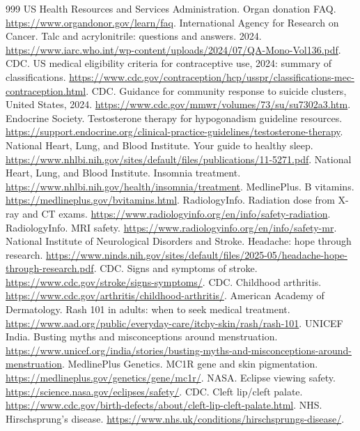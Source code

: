 \documentclass[11pt,oneside]{book}
\begin{document}
\begin{thebibliography}{999}
US Health Resources and Services Administration. Organ donation FAQ. \url{https://www.organdonor.gov/learn/faq}.
International Agency for Research on Cancer. Talc and acrylonitrile: questions and answers. 2024. \url{https://www.iarc.who.int/wp-content/uploads/2024/07/QA-Mono-Vol136.pdf}.
CDC. US medical eligibility criteria for contraceptive use, 2024: summary of classifications. \url{https://www.cdc.gov/contraception/hcp/usspr/classifications-mec-contraception.html}.
CDC. Guidance for community response to suicide clusters, United States, 2024. \url{https://www.cdc.gov/mmwr/volumes/73/su/su7302a3.htm}.
Endocrine Society. Testosterone therapy for hypogonadism guideline resources. \url{https://support.endocrine.org/clinical-practice-guidelines/testosterone-therapy}.
National Heart, Lung, and Blood Institute. Your guide to healthy sleep. \url{https://www.nhlbi.nih.gov/sites/default/files/publications/11-5271.pdf}.
National Heart, Lung, and Blood Institute. Insomnia treatment. \url{https://www.nhlbi.nih.gov/health/insomnia/treatment}.
MedlinePlus. B vitamins. \url{https://medlineplus.gov/bvitamins.html}.
RadiologyInfo. Radiation dose from X-ray and CT exams. \url{https://www.radiologyinfo.org/en/info/safety-radiation}.
RadiologyInfo. MRI safety. \url{https://www.radiologyinfo.org/en/info/safety-mr}.
National Institute of Neurological Disorders and Stroke. Headache: hope through research. \url{https://www.ninds.nih.gov/sites/default/files/2025-05/headache-hope-through-research.pdf}.
CDC. Signs and symptoms of stroke. \url{https://www.cdc.gov/stroke/signs-symptoms/}.
CDC. Childhood arthritis. \url{https://www.cdc.gov/arthritis/childhood-arthritis/}.
American Academy of Dermatology. Rash 101 in adults: when to seek medical treatment. \url{https://www.aad.org/public/everyday-care/itchy-skin/rash/rash-101}.
UNICEF India. Busting myths and misconceptions around menstruation. \url{https://www.unicef.org/india/stories/busting-myths-and-misconceptions-around-menstruation}.
MedlinePlus Genetics. MC1R gene and skin pigmentation. \url{https://medlineplus.gov/genetics/gene/mc1r/}.
NASA. Eclipse viewing safety. \url{https://science.nasa.gov/eclipses/safety/}.
CDC. Cleft lip/cleft palate. \url{https://www.cdc.gov/birth-defects/about/cleft-lip-cleft-palate.html}.
NHS. Hirschsprung's disease. \url{https://www.nhs.uk/conditions/hirschsprungs-disease/}.

\end{thebibliography}
\end{document}
